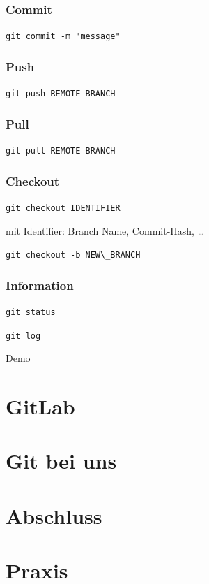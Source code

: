 \documentclass[aspectratio=169]{beamer}
\begin{document}
\begin{frame}
    \frametitle{Commit}
    \begin{center}
        {\Large \lstinline{git commit -m "message"}}
    \end{center}
\end{frame}

\begin{frame}
    \frametitle{Push}
    \begin{center}
        {\Large \lstinline{git push REMOTE BRANCH}}
    \end{center}
\end{frame}

\begin{frame}
    \frametitle{Pull}
    \begin{center}
        {\Large \lstinline{git pull REMOTE BRANCH}}
    \end{center}
\end{frame}

\begin{frame}
    \frametitle{Checkout}
    \begin{center}
        {\Large \lstinline{git checkout IDENTIFIER}}

        mit Identifier: Branch Name, Commit-Hash, \ldots
        \pause

        \vspace{1cm}
    
        {\Large \lstinline{git checkout -b NEW\_BRANCH}}
    \end{center}
\end{frame}

\begin{frame}
    \frametitle{Information}
    \begin{center}
        {\Large \lstinline{git status}}
        \pause

        \vspace{1cm}

        {\Large \lstinline{git log}}
    \end{center}
\end{frame}

\begin{frame}
    \Huge{Demo} 
\end{frame}

\section{GitLab}

\section{Git bei uns}

\section{Abschluss}

\section{Praxis}
\end{document}
